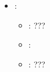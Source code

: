 \begin{itemize}
    \item {}:
           \begin{itemize}
                \item \optionPossibleValues{}: ???
                \item \optionDefaultValue{}: 
                \item \optionDescrption{}: ???
           \end{itemize}
\end{itemize}
